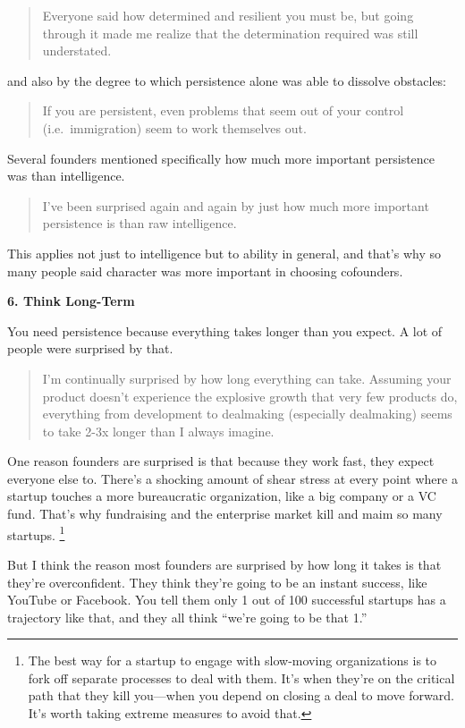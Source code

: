 \documentclass[12pt]{book}
\begin{document}
\begin{quote}
Everyone said how determined and resilient you must be, but going
through it made me realize that the determination required was still
understated.
\end{quote}

and also by the degree to which persistence alone was able to dissolve
obstacles:

\begin{quote}
If you are persistent, even problems that seem out of your control
(i.e.~immigration) seem to work themselves out.
\end{quote}

Several founders mentioned specifically how much more important
persistence was than intelligence.

\begin{quote}
I've been surprised again and again by just how much more important
persistence is than raw intelligence.
\end{quote}

This applies not just to intelligence but to ability in general, and
that's why so many people said character was more important in choosing
cofounders.

\textbf{6. Think Long-Term}

You need persistence because everything takes longer than you expect. A
lot of people were surprised by that.

\begin{quote}
I'm continually surprised by how long everything can take. Assuming your
product doesn't experience the explosive growth that very few products
do, everything from development to dealmaking (especially dealmaking)
seems to take 2-3x longer than I always imagine.
\end{quote}

One reason founders are surprised is that because they work fast, they
expect everyone else to. There's a shocking amount of shear stress at
every point where a startup touches a more bureaucratic organization,
like a big company or a VC fund. That's why fundraising and the
enterprise market kill and maim so many startups.
\footnote{The best way for a startup to engage with slow-moving
organizations is to fork off separate processes to deal with them. It's
when they're on the critical path that they kill you---when you depend
on closing a deal to move forward. It's worth taking extreme measures to
avoid that.}

But I think the reason most founders are surprised by how long it takes
is that they're overconfident. They think they're going to be an instant
success, like YouTube or Facebook. You tell them only 1 out of 100
successful startups has a trajectory like that, and they all think
``we're going to be that 1.''
\end{document}
